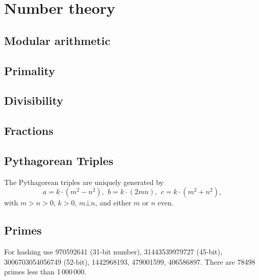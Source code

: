 \chapter{Number theory}

\section{Modular arithmetic}

\section{Primality}

\section{Divisibility}



\section{Fractions}

\section{Pythagorean Triples}
 The Pythagorean triples are uniquely generated by
 \[ a=k\cdot (m^{2}-n^{2}),\ \,b=k\cdot (2mn),\ \,c=k\cdot (m^{2}+n^{2}), \]
 with $m > n > 0$, $k > 0$, $m \bot n$, and either $m$ or $n$ even.

\section{Primes}
	For hashing
	use 970592641 (31-bit number), 31443539979727 (45-bit), 3006703054056749
	(52-bit), 1442968193, 479001599, 406586897.
	There are 78498 primes less than 1\,000\,000.

